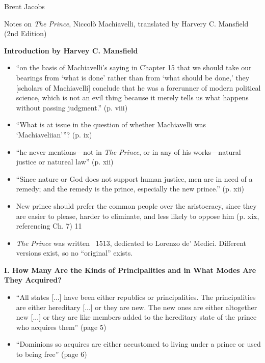 \documentclass[10pt]{article}
\begin{document}
\hfill Brent Jacobs

Notes on \textsl{The Prince}, Niccol\`{o} Machiavelli, translated by
Harvery C. Mansfield (2nd Edition)

\textbf{Introduction by Harvey C. Mansfield}
\begin{itemize}
\item 
    ``on the basis of Machiavelli's saying in Chapter 15 that we should
    take our bearings from `what is done' rather than from `what should be 
    done,' they [scholars of Machiavelli] conclude that he was a forerunner of
    modern political science, which is not an evil thing because it
    merely tells us what happens without passing judgment.'' (p. viii)

\item 
    ``What is at issue in the question of whether Machiavelli was
    `Machiaveliian'''? (p. ix)

\item 
    ``he never mentions---not in \textsl{The Prince}, or in any of his
    works---natural justice or natureal law'' (p. xii)

\item 
    ``Since nature or God does not support human justice, men are in need
    of a remedy; and the remedy is the prince, especially the new prince.''
    (p. xii)

\item 
    New prince should prefer the common people over the aristocracy,
    since they are easier to please, harder to eliminate, and less
    likely to oppose him (p. xix, referencing Ch. 7)
11
\item 
    \textsl{The Prince} was written ~1513, dedicated to Lorenzo de' Medici.
    Different versions exist, so no ``original'' exists.
\end{itemize}

\textbf{I. How Many Are the Kinds of Principalities and in What Modes Are 
They Acquired?}
\begin{itemize}
\item
    ``All states [...] have been either republics or principalities. 
    The principalities are either hereditary [...] or they are new. 
    The new ones are either altogether new [...] or they are like
    members added to the hereditary state of the prince who acquires
    them'' (page 5)
\item ``Dominions so acquires are either accustomed to living under a prince
    or used to being free'' (page 6)
\end{itemize}
\end{document}
